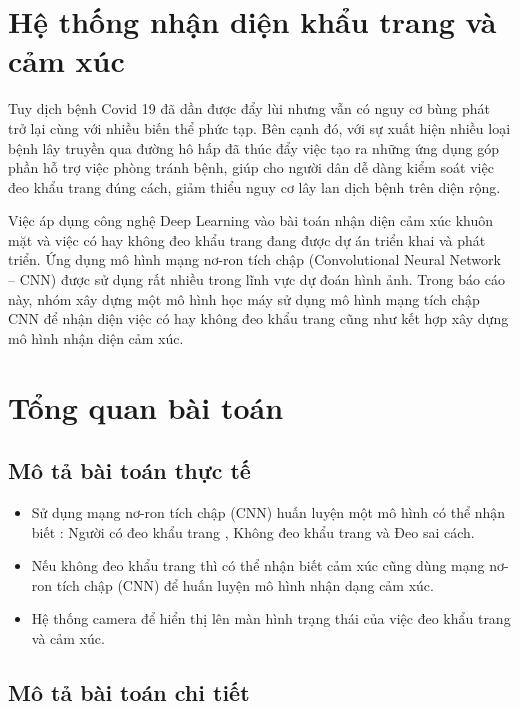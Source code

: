 \section{Hệ thống nhận diện khẩu trang và cảm xúc}

Tuy dịch bệnh Covid 19 đã dần được đẩy lùi nhưng vẫn có nguy cơ bùng phát trở lại cùng với nhiều biến thể phức tạp. Bên cạnh đó, với sự xuất hiện nhiều loại bệnh lây truyền qua đường hô hấp đã thúc đẩy việc tạo ra những ứng dụng góp phần hỗ trợ việc phòng tránh bệnh, giúp cho người dân dễ dàng kiểm soát việc đeo khẩu trang đúng cách, giảm thiểu nguy cơ lây lan dịch bệnh trên diện rộng.

Việc áp dụng công nghệ Deep Learning vào bài toán nhận diện cảm xúc khuôn mặt và việc có hay không đeo khẩu trang đang được dự án triển khai và phát triển. Ứng dụng mô hình mạng nơ-ron tích chập (Convolutional Neural Network – CNN) được sử dụng rất nhiều trong lĩnh vực dự đoán hình ảnh. Trong báo cáo này, nhóm xây dựng một mô hình học máy sử dụng mô hình mạng tích chập CNN để nhận diện việc có hay không đeo khẩu trang cũng như kết hợp xây dựng mô hình nhận diện cảm xúc.

\section{Tổng quan bài toán} 

\subsection{Mô tả bài toán thực tế} 

\begin{itemize}
	\item Sử dụng mạng nơ-ron tích chập (CNN) huấn luyện một mô hình có thể nhận biết : Người có đeo khẩu trang , Không đeo khẩu trang và Đeo sai cách.
	
	\item Nếu không đeo khẩu trang thì có thể nhận biết cảm xúc cũng dùng mạng nơ-ron tích chập (CNN) để huấn luyện mô hình nhận dạng cảm xúc.
	
	\item Hệ thống camera để hiển thị lên màn hình trạng thái của việc đeo khẩu trang và cảm xúc.
\end{itemize}

\subsection{Mô tả bài toán chi tiết}

